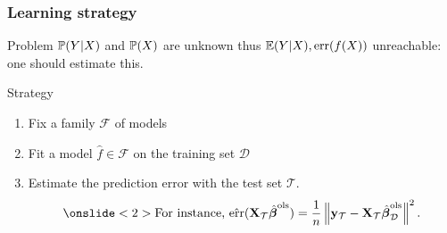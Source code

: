 \documentclass[10pt, c, xcolor=x11names]{beamer}\usepackage[]{graphicx}\usepackage[]{color}
\begin{document}
\begin{frame}
  \frametitle{Learning strategy}

  \begin{block}{Problem}
    $\mathbb{P}(Y|X)$  and  $\mathbb{P}(X)$   are  unknown  thus  $\mathbb{E}(Y|X),  \mathrm{err}(f(X))$
  unreachable: one should \alert{estimate} this.
  \end{block}

  \vfill

  \begin{block}{Strategy}
    \begin{enumerate}
    \item  Fix a family $\mathcal{F}$ of models\\
      \bigskip
    \item Fit a model $\hat{f}\in\mathcal{F}$ on the training set $\mathcal{D}$\\ 
      \bigskip
    \item Estimate the prediction error with the test set $\mathcal{T}$.
       \begin{equation*}
         \onslide<2>{\text{For instance, }\hat{\err}(\bX_{\mathcal{T}}\hatbbetaols) = \frac{1}{n} \left\|
         \by_{\mathcal{T}}- \bX_{\mathcal{T}} \hatbbetaols_{\mathcal{D}}\right\|^2.}
       \end{equation*}
    \end{enumerate}
  \end{block}
\end{frame}
\end{document}
